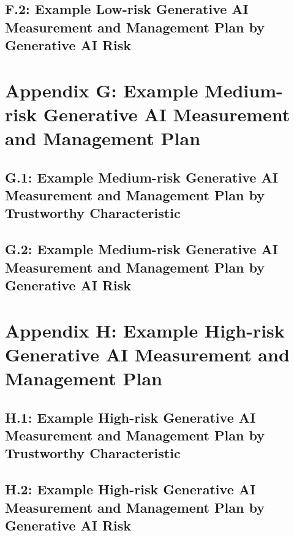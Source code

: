 \documentclass[fleqn]{article}
\begin{document}
\subsection{F.2: Example Low-risk Generative AI Measurement and Management Plan by Generative AI Risk}\label{appdxf2}

\section*{Appendix G: Example Medium-risk Generative AI Measurement and Management Plan}\label{sec:appndxg}

\subsection{G.1: Example Medium-risk Generative AI Measurement and Management Plan by Trustworthy Characteristic}\label{appdxg1}

\subsection{G.2: Example Medium-risk Generative AI Measurement and Management Plan by Generative AI Risk}\label{appdxg2}

\section*{Appendix H: Example High-risk Generative AI Measurement and Management Plan}\label{sec:appndxh}

\subsection{H.1: Example High-risk Generative AI Measurement and Management Plan by Trustworthy Characteristic}\label{appdxh1}

\subsection{H.2: Example High-risk Generative AI Measurement and Management Plan by Generative AI Risk}\label{appdxh2}
\end{document}
